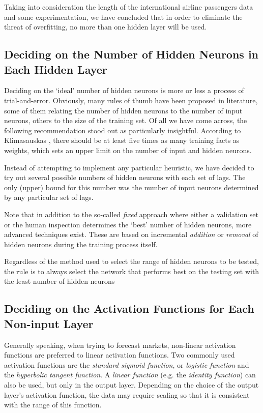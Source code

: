 Taking into consideration the length of the international airline passengers data and some experimentation, we have concluded that in order to eliminate the threat of overfitting, no more than one hidden layer will be used.

\subsection{Deciding on the Number of Hidden Neurons in Each Hidden Layer}

Deciding on the `ideal' number of hidden neurons is more or less a process of trial-and-error. Obviously, many rules of thumb have been proposed in literature, some of them relating the number of hidden neurons to the number of input neurons, others to the size of the training set. Of all we have come across, the following recommendation stood out as particularly insightful. According to Klimasauskas \cite{Klimasauskas93}, there should be at least five times as many training facts as weights, which sets an upper limit on the number of input and hidden neurons.

Instead of attempting to implement any particular heuristic, we have decided to try out several possible numbers of hidden neurons with each set of lags. The only (upper) bound for this number was the number of input neurons determined by any particular set of lags.

Note that in addition to the so-called \textit{fixed} approach where either a validation set or the human inspection determines the `best' number of hidden neurons, more advanced techniques exist. These are based on incremental \textit{addition} or \textit{removal} of hidden neurons during the training process itself.

Regardless of the method used to select the range of hidden neurons to be tested, the rule is to always select the network that performs best on the testing set with the least number of hidden neurons \cite{Kaastra95}

\subsection{Deciding on the Activation Functions for Each Non-input Layer}

Generally speaking, when trying to forecast markets, non-linear activation functions are preferred to linear activation functions. Two commonly used activation functions are the \textit{standard sigmoid function}, or \textit{logistic function} and the \textit{hyperbolic tangent function}. A \textit{linear function} (e.g. the \textit{identity function}) can also be used, but only in the output layer.
Depending on the choice of the output layer's activation function, the data may require scaling so that it is consistent with the range of this function.

